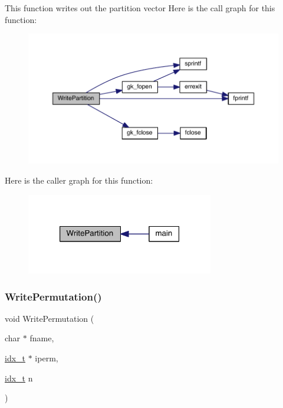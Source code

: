 This function writes out the partition vector Here is the call graph for this function\+:\nopagebreak
\begin{figure}[H]
\begin{center}
\leavevmode
\includegraphics[width=350pt]{a00948_ad05062397a736c5602a72c2419deffbf_cgraph}
\end{center}
\end{figure}
Here is the caller graph for this function\+:\nopagebreak
\begin{figure}[H]
\begin{center}
\leavevmode
\includegraphics[width=232pt]{a00948_ad05062397a736c5602a72c2419deffbf_icgraph}
\end{center}
\end{figure}
\mbox{\label{a00948_a1c37c9f8d06b4dea85ac0ab2abe762eb}} 
\subsubsection{\texorpdfstring{Write\+Permutation()}{WritePermutation()}}
{\footnotesize\ttfamily void Write\+Permutation (\begin{DoxyParamCaption}\item[{char $\ast$}]{fname,  }\item[{\hyperlink{a00876_aaa5262be3e700770163401acb0150f52}{idx\+\_\+t} $\ast$}]{iperm,  }\item[{\hyperlink{a00876_aaa5262be3e700770163401acb0150f52}{idx\+\_\+t}}]{n }\end{DoxyParamCaption})}

